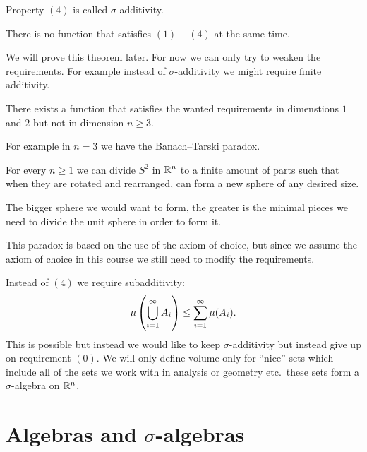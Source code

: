\documentclass[11pt,a4paper]{article}
\begin{document}
\begin{remark}
  Property $(4)$ is called $\sigma$-additivity.
\end{remark}

\begin{theorem}[Hausdorrf, 1914]
  There is no function that satisfies $(1) - (4)$ at the same time.
\end{theorem}

We will prove this theorem later.
For now we can only try to weaken the requirements.
For example instead of $\sigma$-additivity we might require finite
additivity.

\begin{theorem}
  There exists a function that satisfies the wanted requirements in
  dimenstions $1$ and $2$ but not in dimension $n \geq 3$.
\end{theorem}

\begin{remark}
  For example in $n = 3$ we have the Banach--Tarski paradox.
\end{remark}

\begin{paradox}
  For every $n \geq 1$ we can divide $S^2$ in $\mathbb{R}^n$ to a finite amount 
  of parts such that when they are rotated and rearranged,
  can form a new sphere of any desired size.
\end{paradox}
\begin{remark}
  The bigger sphere we would want to form, the greater is the minimal
  pieces we need to divide the unit sphere in order to form it.
\end{remark}

This paradox is based on the use of the axiom of choice, but since we
assume the axiom of choice in this course we still need to modify the
requirements.

Instead of $(4)$ we require subadditivity:
\[
\mu\del{\bigcup_{i=1}^{\infty} A_i} \le \sum_{i=1}^{\infty} \mu(A_i).
\]
This is possible but instead we would like to keep $\sigma$-additivity
but instead give up on requirement $(0)$.
We will only define volume only for ``nice'' sets which include
all of the sets we work with in analysis or geometry etc.\ these
sets form a $\sigma$-algebra on $\mathbb{R}^n$.

\newpage

\section{Algebras and \texorpdfstring{$\sigma$}{s}-algebras}
\end{document}
